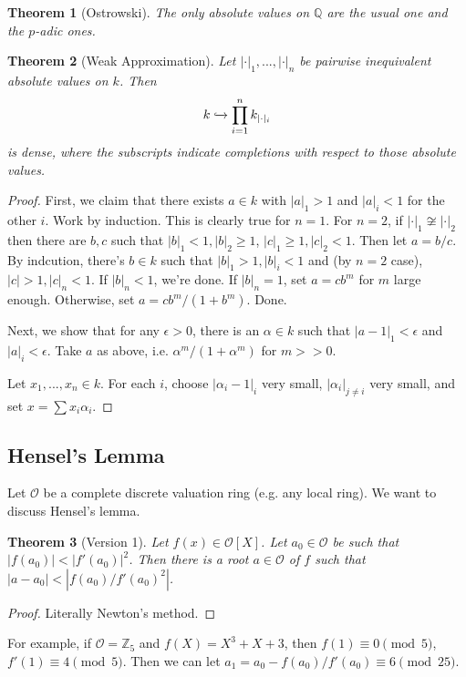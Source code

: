 \documentclass[letterpaper, 12pt]{article}
\newtheorem{thm}{Theorem}[subsection]
\newcommand{\iso}{\cong}
\newcommand{\Z}{\mathbb{Z}}
\newcommand{\Q}{\mathbb{Q}}
\begin{document}
\begin{thm}[Ostrowski]
The only absolute values on $\Q$ are the usual one and the $p$-adic ones.
\end{thm}

\begin{thm}[Weak Approximation]
  Let $| \cdot |_1, ..., | \cdot |_n$ be pairwise inequivalent absolute values on $k$. Then \[ k \xhookrightarrow{} \prod_{i = 1}^n k_{| \cdot |_i} \] is dense, where the subscripts indicate completions with respect to those absolute values.
\end{thm}

\begin{proof}
First, we claim that there exists $a \in k$ with $|a|_1 > 1$ and $|a|_i < 1$ for the other $i$. Work by induction. This is clearly true for $n = 1$. For $n = 2$, if $| \cdot |_1 \not \iso | \cdot |_2$ then there are $b, c$ such that $|b|_1 < 1, |b|_2 \geq 1$, $|c|_1 \geq 1, |c|_2 < 1$. Then let $a = b/c$. By indcution, there's $b \in k$ such that $|b|_1 > 1, |b|_i < 1$ and (by $n = 2$ case), $|c| > 1, |c|_n < 1$. If $|b|_n < 1$, we're done. If $|b|_n = 1$, set $a = cb^m$ for $m$ large enough. Otherwise, set $a = cb^m/(1 + b^m)$. Done.

Next, we show that for any $\epsilon > 0$, there is an $\alpha \in k$ such that $|a - 1|_1 < \epsilon$ and $|a|_i < \epsilon$. Take $a$ as above, i.e. $\alpha^m/(1 + \alpha^m)$ for $m >> 0$. 

Let $x_1, ..., x_n \in k$. For each $i$, choose $|\alpha_i - 1|_i$ very small, $|\alpha_i|_{j \neq i}$ very small, and set $x = \sum x_i \alpha_i$.
\end{proof}

\subsection{Hensel's Lemma}
Let $\mathcal{O}$ be a complete discrete valuation ring (e.g. any local ring). We want to discuss Hensel's lemma.

\begin{thm}[Version 1]
  Let $f(x) \in \mathcal{O}[X]$. Let $a_0 \in \mathcal{O}$ be such that $|f(a_0)| < |f'(a_0)|^2$. Then there is a root $a \in \mathcal{O}$ of $f$ such that $|a - a_0| < |f(a_0)/f'(a_0)^2|$.
\end{thm}
\begin{proof}
Literally Newton's method.
\end{proof}

For example, if $\mathcal{O} = \Z_5$ and $f(X) = X^3 + X + 3$, then $f(1) \equiv 0 \pmod 5$, $f'(1) \equiv 4 \pmod 5$. Then we can let $a_1 = a_0 - f(a_0)/f'(a_0) \equiv 6 \pmod 25$.
\end{document}
